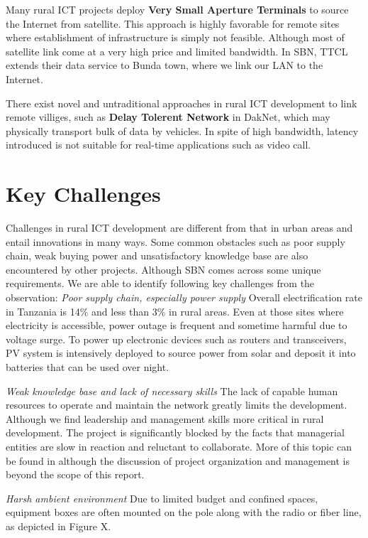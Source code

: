 Many rural ICT projects deploy \textbf{Very Small Aperture Terminals} to source the Internet from satellite. This approach is highly favorable for remote sites where establishment of infrastructure is simply not feasible. Although most of satellite link come at a very high price and limited bandwidth. In SBN, TTCL extends their data service to Bunda town, where we link our LAN to the Internet.

There exist novel and untraditional approaches in rural ICT development to link remote villiges, such as \textbf{Delay Tolerent Network} in DakNet\cite{pentland2004daknet}, which may physically transport bulk of data by vehicles. In spite of high bandwidth, latency introduced is not suitable for real-time applications such as video call.

\section{Key Challenges}
Challenges in rural ICT development are different from that in urban areas and entail innovations in many ways. Some common obstacles such as poor supply chain, weak buying power and unsatisfactory knowledge base are also encountered by other projects. Although SBN comes across some unique requirements. We are able to identify following key challenges from the observation:
\textit{Poor supply chain, especially power supply}
Overall electrification rate in Tanzania is 14\% and less than 3\% in rural areas. Even at those sites where electricity is accessible, power outage is frequent and sometime harmful due to voltage surge. To power up electronic devices such as routers and transceivers, PV system is intensively deployed to source power from solar and deposit it into batteries that can be used over night.

\textit{Weak knowledge base and lack of necessary skills}
The lack of capable human resources to operate and maintain the network greatly limits the development. Although we find leadership and management skills more critical in rural development. The project is significantly blocked by the facts that managerial entities are slow in reaction and reluctant to collaborate. More of this topic can be found in \cite{nungu2011business} although the discussion of project organization and management is beyond the scope of this report.

\textit{Harsh ambient environment}
Due to limited budget and confined spaces, equipment boxes are often mounted on the pole along with the radio or fiber line, as depicted in Figure X.

